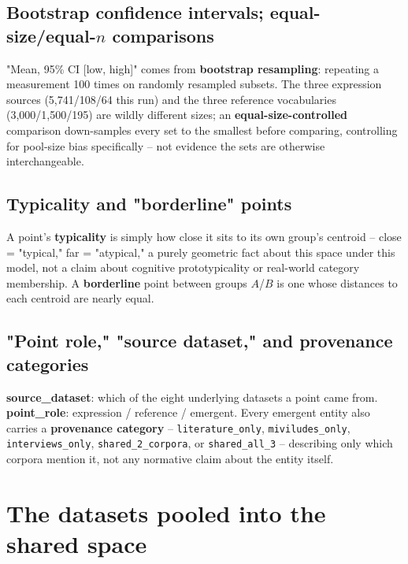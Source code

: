 \documentclass[11pt,a4paper]{article}
\newcommand{\jargon}[1]{\textbf{#1}}
\begin{document}
\subsection{Bootstrap confidence intervals; equal-size/equal-$n$ comparisons}
"Mean, 95\% CI [low, high]" comes from \jargon{bootstrap resampling}:
repeating a measurement 100 times on randomly resampled subsets. The
three expression sources (5,741/108/64 this run) and the three reference
vocabularies (3,000/1,500/195) are wildly different sizes; an
\jargon{equal-size-controlled} comparison down-samples every set to the
smallest before comparing, controlling for pool-size bias specifically
-- not evidence the sets are otherwise interchangeable.

\subsection{Typicality and "borderline" points}
A point's \jargon{typicality} is simply how close it sits to its own
group's centroid -- close = "typical," far = "atypical," a purely
geometric fact about this space under this model, not a claim about
cognitive prototypicality or real-world category membership. A
\jargon{borderline} point between groups $A$/$B$ is one whose distances
to each centroid are nearly equal.

\subsection{"Point role," "source dataset," and provenance categories}
\jargon{source\_dataset}: which of the eight underlying datasets a point
came from. \jargon{point\_role}: expression / reference / emergent.
Every emergent entity also carries a \jargon{provenance category} --
\texttt{literature\_only}, \texttt{miviludes\_only},
\texttt{interviews\_only}, \texttt{shared\_2\_corpora}, or
\texttt{shared\_all\_3} -- describing only which corpora mention it, not
any normative claim about the entity itself.

\section{The datasets pooled into the shared space}
\end{document}
